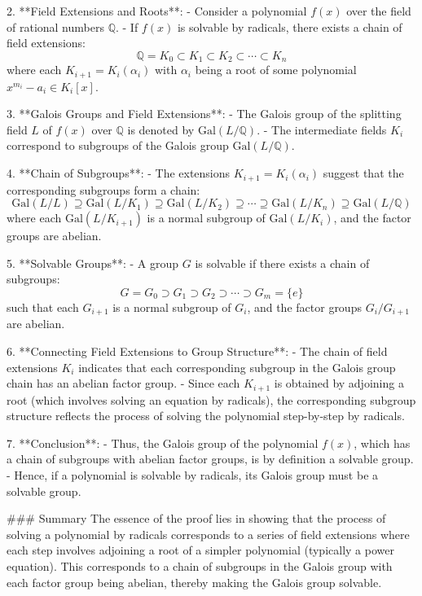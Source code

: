 2. **Field Extensions and Roots**:
   - Consider a polynomial \( f(x) \) over the field of rational numbers \( \mathbb{Q} \).
   - If \( f(x) \) is solvable by radicals, there exists a chain of field extensions:
     \[
     \mathbb{Q} = K_0 \subset K_1 \subset K_2 \subset \cdots \subset K_n
     \]
     where each \( K_{i+1} = K_i(\alpha_i) \) with \( \alpha_i \) being a root of some polynomial \( x^{m_i} - a_i \in K_i[x] \).

3. **Galois Groups and Field Extensions**:
   - The Galois group of the splitting field \( L \) of \( f(x) \) over \( \mathbb{Q} \) is denoted by \( \text{Gal}(L/\mathbb{Q}) \).
   - The intermediate fields \( K_i \) correspond to subgroups of the Galois group \( \text{Gal}(L/\mathbb{Q}) \).

4. **Chain of Subgroups**:
   - The extensions \( K_{i+1} = K_i(\alpha_i) \) suggest that the corresponding subgroups form a chain:
     \[
     \text{Gal}(L/L) \supseteq \text{Gal}(L/K_1) \supseteq \text{Gal}(L/K_2) \supseteq \cdots \supseteq \text{Gal}(L/K_n) \supseteq \text{Gal}(L/\mathbb{Q})
     \]
     where each \( \text{Gal}(L/K_{i+1}) \) is a normal subgroup of \( \text{Gal}(L/K_i) \), and the factor groups are abelian.

5. **Solvable Groups**:
   - A group \( G \) is solvable if there exists a chain of subgroups:
     \[
     G = G_0 \supset G_1 \supset G_2 \supset \cdots \supset G_m = \{e\}
     \]
     such that each \( G_{i+1} \) is a normal subgroup of \( G_i \), and the factor groups \( G_i/G_{i+1} \) are abelian.

6. **Connecting Field Extensions to Group Structure**:
   - The chain of field extensions \( K_i \) indicates that each corresponding subgroup in the Galois group chain has an abelian factor group.
   - Since each \( K_{i+1} \) is obtained by adjoining a root (which involves solving an equation by radicals), the corresponding subgroup structure reflects the process of solving the polynomial step-by-step by radicals.

7. **Conclusion**:
   - Thus, the Galois group of the polynomial \( f(x) \), which has a chain of subgroups with abelian factor groups, is by definition a solvable group.
   - Hence, if a polynomial is solvable by radicals, its Galois group must be a solvable group.

### Summary
The essence of the proof lies in showing that the process of solving a polynomial by radicals corresponds to a series of field extensions where each step involves adjoining a root of a simpler polynomial (typically a power equation). This corresponds to a chain of subgroups in the Galois group with each factor group being abelian, thereby making the Galois group solvable.



